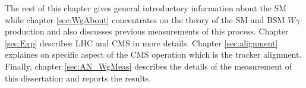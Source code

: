 The rest of this chapter gives general introductory information about the SM while chapter \ref{sec:WgAbout} concentrates on the theory of the SM and BSM $W\gamma$ production and also discusses previous measurements of this process. Chapter \ref{sec:Exp} describes LHC and CMS in more details. Chapter \ref{sec:alignment} explaines on specific aspect of the CMS operation which is the tracker alignment. Finally, chapter \ref{sec:AN_WgMeas} describes the details of the measurement of this dissertation and reports the results.\\ 



%
%
%
%
%
%
